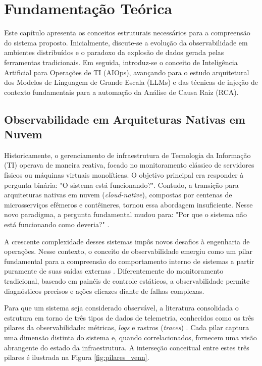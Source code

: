 \chapter{Fundamentação Teórica}
\label{chap:fundamentacao}

Este capítulo apresenta os conceitos estruturais necessários para a compreensão do sistema proposto. Inicialmente, discute-se a evolução da observabilidade em ambientes distribuídos e o paradoxo da explosão de dados gerada pelas ferramentas tradicionais. Em seguida, introduz-se o conceito de Inteligência Artificial para Operações de TI (AIOps), avançando para o estudo arquitetural dos Modelos de Linguagem de Grande Escala (LLMs) e das técnicas de injeção de contexto fundamentais para a automação da Análise de Causa Raiz (RCA).

\section{Observabilidade em Arquiteturas Nativas em Nuvem}
\label{sec:observabilidade}

Historicamente, o gerenciamento de infraestrutura de Tecnologia da Informação (TI) operava de maneira reativa, focado no monitoramento clássico de servidores físicos ou máquinas virtuais monolíticas. O objetivo principal era responder à pergunta binária: "O sistema está funcionando?". Contudo, a transição para arquiteturas nativas em nuvem (\textit{cloud-native}), compostas por centenas de microsserviços efêmeros e contêineres, tornou essa abordagem insuficiente. Nesse novo paradigma, a pergunta fundamental mudou para: "Por que o sistema não está funcionando como deveria?" \cite{wang_2025_integrating}.

A crescente complexidade desses sistemas impôs novos desafios à engenharia de operações. Nesse contexto, o conceito de observabilidade emergiu como um pilar fundamental para a compreensão do comportamento interno de sistemas a partir puramente de suas saídas externas \cite{notaro2021survey}. Diferentemente do monitoramento tradicional, baseado em painéis de controle estáticos, a observabilidade permite diagnósticos precisos e ações eficazes diante de falhas complexas.

Para que um sistema seja considerado observável, a literatura consolidada o estrutura em torno de três tipos de dados de telemetria, conhecidos como os três pilares da observabilidade: métricas, \textit{logs} e rastros (\textit{traces}) \cite{zhang2024survey}. Cada pilar captura uma dimensão distinta do sistema e, quando correlacionados, fornecem uma visão abrangente do estado da infraestrutura. A interseção conceitual entre estes três pilares é ilustrada na Figura \ref{fig:pilares_venn}.

